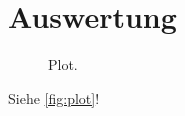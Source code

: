 \section{Auswertung}
\label{sec:Auswertung}

\begin{figure}
  \centering
  \caption{Plot.}
  \label{fig:plot}
\end{figure}


Siehe \autoref{fig:plot}!
